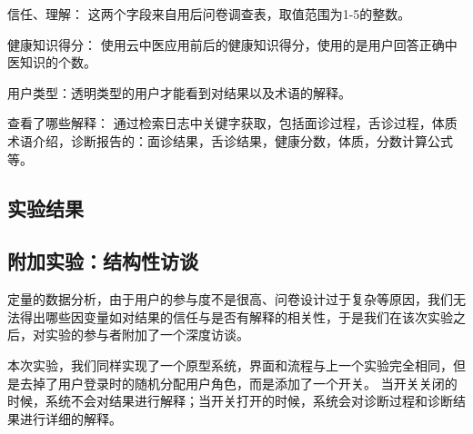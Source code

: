 信任、理解： 这两个字段来自用后问卷调查表，取值范围为1-5的整数。

健康知识得分： 使用云中医应用前后的健康知识得分，使用的是用户回答正确中医知识的个数。

用户类型：透明类型的用户才能看到对结果以及术语的解释。

查看了哪些解释： 通过检索日志中关键字获取，包括面诊过程，舌诊过程，体质术语介绍，诊断报告的：面诊结果，舌诊结果，健康分数，体质，分数计算公式等。

\subsection{实验结果}

















\subsection{附加实验：结构性访谈}

定量的数据分析，由于用户的参与度不是很高、问卷设计过于复杂等原因，我们无法得出哪些因变量如对结果的信任与是否有解释的相关性，于是我们在该次实验之后，对实验的参与者附加了一个深度访谈。

本次实验，我们同样实现了一个原型系统，界面和流程与上一个实验完全相同，但是去掉了用户登录时的随机分配用户角色，而是添加了一个开关。
当开关关闭的时候，系统不会对结果进行解释；当开关打开的时候，系统会对诊断过程和诊断结果进行详细的解释。

